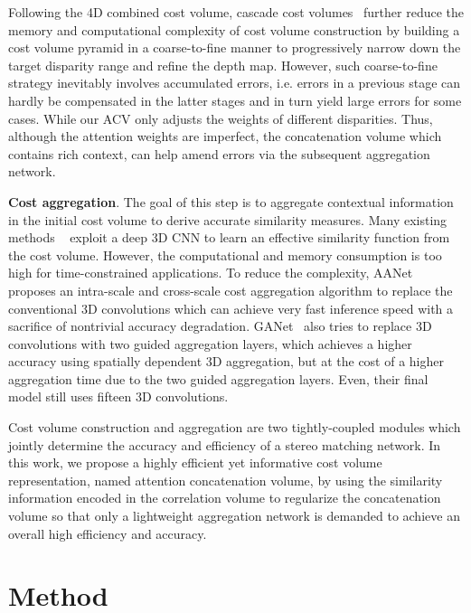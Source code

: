 \documentclass[10pt,twocolumn,letterpaper]{article}
\begin{document}
Following the 4D combined cost volume,
cascade cost volumes~\cite{shen2021cfnet,gu2020cascade,wang2021patchmatchnet} further reduce the memory and computational complexity of cost volume construction by building a cost volume pyramid in a coarse-to-fine manner to progressively narrow down the target disparity range and refine the depth map. However, such coarse-to-fine strategy inevitably involves accumulated errors, i.e. errors in a previous stage can hardly be compensated in the latter stages and in turn yield large errors for some cases. While our ACV only adjusts the weights of different disparities. Thus, although the attention weights are imperfect, the concatenation volume which contains rich context, can help amend errors via the subsequent aggregation network.

\textbf{Cost aggregation}. The goal of this step is to aggregate contextual information in the initial cost volume to derive accurate similarity measures. Many existing methods ~\cite{chang2018pyramid, nie2019multi,chabra2019stereodrnet} exploit a deep 3D CNN to learn an effective similarity function from the cost volume. However, the computational and memory consumption is too high for time-constrained applications. To reduce the complexity, AANet~\cite{xu2020aanet} proposes an intra-scale and cross-scale cost aggregation algorithm to replace the conventional 3D convolutions which can achieve very fast inference speed with a sacrifice of nontrivial accuracy degradation. GANet~\cite{zhang2019ga} also tries to replace 3D convolutions with two guided aggregation layers, which achieves a higher accuracy using spatially dependent 3D aggregation, but at the cost of a higher aggregation time due to the two guided aggregation layers. Even, their final model still uses fifteen 3D convolutions.

Cost volume construction and aggregation are two tightly-coupled modules which jointly determine the accuracy and efficiency of a stereo matching network. In this work, we propose a highly efficient yet informative cost volume representation, named attention concatenation volume, by using the similarity information encoded in the correlation volume to regularize the concatenation volume so that only a lightweight aggregation network is demanded to achieve an overall high efficiency and accuracy. 


\section{Method}\label{sec:method}
\end{document}
